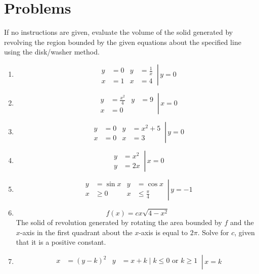 \documentclass[12pt, A4]{report}
\begin{document}
		\section*{Problems}
			If no instructions are given, evaluate the volume of the solid generated by revolving the region bounded by the given equations about the specified line using the disk/washer method.
			\begin{enumerate}
				\item
					\[
						\left.\begin{aligned}
							y &= 0 &
								y &= \frac{1}{x} \\
							x &= 1 &
								x &= 4
						\end{aligned}\,\right|\, y = 0
					\]
				\item
					\[
						\left.\begin{aligned}
							y &= \frac{x^2}{4} &
								y &= 9 \\
							x &= 0
						\end{aligned}\,\right|\, x = 0
					\]
				\item
					\[
						\left.\begin{aligned}
							y &= 0 & 
								y &= x^2 + 5 \\
							x &= 0 &
								x &= 3
						\end{aligned}\,\right|\, y = 0
					\]
				\item
					\[
						\left.\begin{aligned}
							y &= x^2 \\
							y &= 2x 
						\end{aligned}\,\right|\, x = 0
					\]
				\item
					\[
						\left.\begin{aligned}
							y &= \sin x &
								y &= \cos x \\
							x &\ge 0 & 
								x &\le \frac{\pi}{4}
						\end{aligned}\,\right|\, y = -1
					\]
				\item
					\[f(x) = cx\sqrt{4 - x^2}\]
					The solid of revolution generated by rotating the area bounded by $f$ and the $x$-axis in the first quadrant about the $x$-axis is equal to $2\pi$. Solve for $c$, given that it is a positive constant.
				\item
					\[
						\left.\begin{aligned}
							x &= (y - k)^2 &
								y &= x + k \mid k \le 0 \text{ or } k \ge 1 \\
						\end{aligned}\,\right|\, x = k
\]
\end{enumerate}
\end{document}
